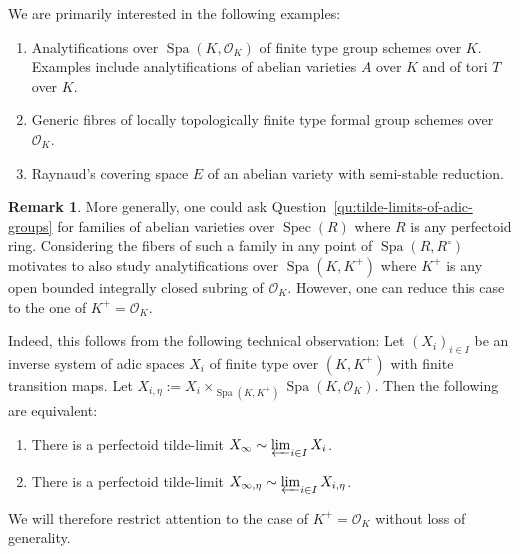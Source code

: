 \documentclass[10pt,oneside]{amsart}
\theoremstyle{definition}
\newtheorem{remark}[theorem]{Remark}
\newcommand{\Spec}{\operatorname{Spec}}
\newcommand{\Spa}{\operatorname{Spa}}
\renewcommand{\O}{\mathcal{O}}
\begin{document}
We are primarily interested in the following examples:
\begin{enumerate}	 
	\item Analytifications over $\Spa(K,\O_K)$ of finite type group schemes over $K$. Examples include analytifications of abelian varieties $A$ over $K$ and of tori $T$ over $K$.
	\item Generic fibres of locally topologically finite type formal group schemes over $\mathcal O_K$.
	\item Raynaud's covering space $E$  of an abelian variety with semi-stable reduction.
\end{enumerate}
\begin{remark}
	More generally, one could ask Question~\ref{qu:tilde-limits-of-adic-groups} for families of abelian varieties over $\Spec(R)$ where $R$ is any perfectoid ring. Considering the fibers of such a family in any point of $\Spa(R,R^\circ)$ motivates to also study analytifications over $\Spa(K,K^+)$ where $K^+$ is any open bounded integrally closed subring of $\O_K$. However, one can reduce this case to the one of $K^+=\O_K$.
	
	Indeed, this follows from the following technical observation:
	Let $(X_i)_{i\in I}$ be an inverse system of adic spaces $X_i$ of finite type over $(K,K^+)$ with finite transition maps. Let $X_{i,\eta}:=X_i\times_{\Spa(K,K^+)}\Spa(K,\mathcal O_K)$. Then the following are equivalent: 
	\begin{enumerate}
	\item There is a perfectoid tilde-limit $X_{\infty}\sim \varprojlim_{i \in I}X_{i}$. 
	\item There is a perfectoid tilde-limit $X_{\infty,\eta}\sim \varprojlim_{i \in I}X_{i,\eta}$.
	\end{enumerate}
We will therefore restrict attention to the case of  $K^+=\O_K$ without loss of generality.
\end{remark}
\iffalse
\end{document}
